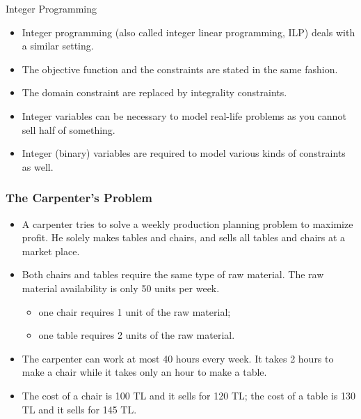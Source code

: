 \documentclass[11pt]{beamer}
\begin{document}
\begin{frame}{Integer Programming}
\begin{itemize}
\item<1-> Integer programming (also called integer linear programming, ILP) deals with a similar setting.
\item<2-> The objective function and the constraints are stated in the same fashion.
\item<3-> The domain constraint are replaced by integrality constraints.
\item<4-> Integer variables can be necessary to model real-life problems as you cannot sell half of something.
\item<5-> Integer (binary) variables are required to model various kinds of constraints as well.
\end{itemize}
\end{frame}

\begin{frame}
\frametitle{The Carpenter’s Problem}
\begin{itemize}
\item A carpenter tries to solve a weekly production planning problem to maximize profit.  He solely makes tables and chairs, and sells all tables and chairs at a market place.
\item Both chairs and tables require the same type of raw material.  The raw material availability is only 50 units per week.
\begin{itemize}
\item one chair requires 1 unit of the raw material;
\item one table requires 2 units of the raw material.
\end{itemize}
\item The carpenter can work at most 40 hours every week. It takes 2 hours to make a chair while it takes only an hour to make a table.
\item The cost of a chair is 100 TL and it sells for 120 TL; the cost of a table is 130 TL and it sells for 145 TL.
\end{itemize}

\pause
{}
\end{frame}
\end{document}

